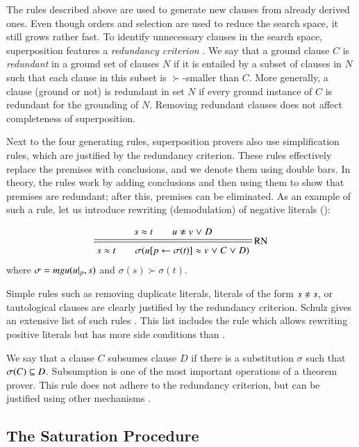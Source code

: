 The rules described above are used to generate new clauses from already derived
ones. Even though orders and selection are used to reduce the search space,
it still grows rather fast. To identify unnecessary clauses in the search
space, superposition features a \emph{redundancy criterion}
\cite[Sect.~4.2.2]{bg-01-resolution}. We say that a ground clause $C$ is
{\em redundant} in a ground set of clauses $N$ if it is entailed by a subset of
clauses in $N$ such that each clause in this subset is $\succ$-smaller than $C$. More
generally, a clause (ground or not) is redundant in set $N$ if every ground
instance of $C$ is redundant for the grounding of $N$. Removing redundant
clauses does not affect completeness of superposition.

Next to the four generating rules, superposition provers also use
simplification rules, which are justified by the redundancy criterion. These
rules effectively replace the pre\-mises with conclusions, and we denote them
using double bars. In theory, the rules work by adding conclusions and then
using them to show that premises are redundant; after this, premises can be eliminated. As
an example of such a rule, let us introduce rewriting (demodulation) of negative
literals ():

\[
\namedsimp{RN}{s \eq t \qquad u \noteq v \llor D}
              {s \eq t \qquad \sigmacl{u[p \leftarrow \sigma(t)] \eq v \llor C \llor D}}
\]
where $\sigma = \mathit{mgu}(u|_p, s)$ and $\sigma(s) \succ \sigma(t)$.


Simple rules such as removing duplicate literals, literals of the form $s \noteq
s$, or tautological clauses are clearly justified by the redundancy criterion.
Schulz gives an extensive list of such rules \cite{ss-02-brainiac}. This list
includes the rule which allows rewriting positive literals but has more side
conditions than .

We say that a clause $C$ subsumes clause $D$ if there is a substitution $\sigma$
such that $\sigma(C) \subseteq D$. Subsumption is one of the most important
operations of a theorem prover. This rule does not adhere to the redundancy
criterion, but can be justified using other mechanisms \cite{wtrb-20-sat-framework}.

\subsection{The Saturation Procedure}
\label{sec:pre:saturation}

